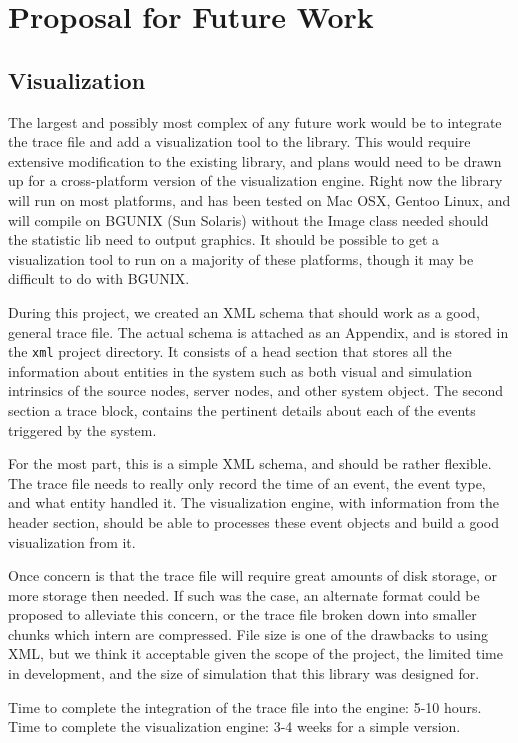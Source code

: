 \documentclass[12pt]{report}
\newcommand{\mychapter}[1]{\chapter{#1} \label{ch:#1} \thispagestyle{fancy}}
\begin{document}
\mychapter{Proposal for Future Work}

\section{Visualization}
	The largest and possibly most complex of any future work would be to integrate the trace file and add a visualization tool to the library.  This would require extensive modification to the existing library, and plans would need to be drawn up for a cross-platform version of the visualization engine.  Right now the library will run on most platforms, and has been tested on Mac OSX, Gentoo Linux, and will compile on BGUNIX (Sun Solaris) without the Image class needed should the statistic lib need to output graphics.  It should be possible to get a visualization tool to run on a majority of these platforms, though it may be difficult to do with BGUNIX.

	During this project, we created an XML schema that should work as a good, general trace file.  The actual schema is attached as an Appendix, and is stored in the \texttt{xml} project directory.  It consists of a head section that stores all the information about entities in the system such as both visual and simulation intrinsics of the source nodes, server nodes, and other system object.  The second section a trace block, contains the pertinent details about each of the events triggered by the system.

	For the most part, this is a simple XML schema, and should be rather flexible.  The trace file needs to really only record the time of an event, the event type, and what entity handled it.  The visualization engine, with information from the header section, should be able to processes these event objects and build a good visualization from it.

	Once concern is that the trace file will require great amounts of disk storage, or more storage then needed.  If such was the case, an alternate format could be proposed to alleviate this concern, or the trace file broken down into smaller chunks which intern are compressed.  File size is one of the drawbacks to using XML, but we think it acceptable given the scope of the project, the limited time in development, and the size of simulation that this library was designed for.

	Time to complete the integration of the trace file into the engine: 5-10 hours.  Time to complete the visualization engine: 3-4 weeks for a simple version.
\end{document}
